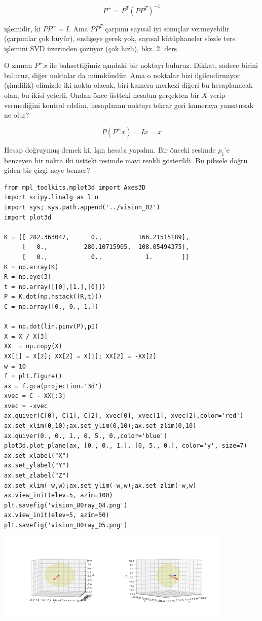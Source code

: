 \documentclass[12pt,fleqn]{article}\usepackage{../../common}
\begin{document}
$$ P^{+} = P^T(PP^T)^{-1}$$

işlemidir, ki $PP^{+} = I$. Ama $PP^T$ çarpımı sayısal iyi sonuçlar
vermeyebilir (çarpımlar çok büyür), endişeye gerek yok, sayısal
kütüphaneler sözde ters işlemini SVD üzerinden çözüyor (çok hızlı),
bkz. 2. ders.

O zaman $P^{+}x$ ile bahsettiğimiz ışındaki bir noktayı buluruz. Dikkat,
sadece birini buluruz, diğer noktalar da mümkündür. Ama o noktalar bizi
ilgilendirmiyor (şimdilik) elimizde iki nokta olacak, biri kamera merkezi
diğeri bu hesaplanacak olan, bu ikisi yeterli. Ondan önce üstteki hesabın
gerçekten bir $X$ verip vermediğini kontrol edelim, hesaplanan noktayı
tekrar geri kameraya yansıtırsak ne olur?

$$ P (P^{+}x) = Ix = x$$

Hesap doğruymuş demek ki. Işın hesabı yapalım. Bir önceki resimde $p_1$'e
benzeyen bir nokta iki üstteki resimde mavi renkli gösterildi. Bu piksele
doğru giden bir çizgi neye benzer?

\begin{verbatim}
from mpl_toolkits.mplot3d import Axes3D
import scipy.linalg as lin
import sys; sys.path.append('../vision_02')
import plot3d

K = [[ 282.363047,      0.,          166.21515189],
     [   0.,          280.10715905,  108.05494375],
     [   0.,            0.,            1.        ]]
K = np.array(K)
R = np.eye(3)
t = np.array([[0],[1.],[0]])
P = K.dot(np.hstack((R,t)))
C = np.array([0., 0., 1.])

X = np.dot(lin.pinv(P),p1)
X = X / X[3]
XX  = np.copy(X)
XX[1] = X[2]; XX[2] = X[1]; XX[2] = -XX[2]
w = 10
f = plt.figure()
ax = f.gca(projection='3d')
xvec = C - XX[:3] 
xvec = -xvec
ax.quiver(C[0], C[1], C[2], xvec[0], xvec[1], xvec[2],color='red')
ax.set_xlim(0,10);ax.set_ylim(0,10);ax.set_zlim(0,10)
ax.quiver(0., 0., 1., 0, 5., 0.,color='blue')
plot3d.plot_plane(ax, [0., 0., 1.], [0, 5., 0.], color='y', size=7)
ax.set_xlabel("X")
ax.set_ylabel("Y")
ax.set_zlabel("Z")
ax.set_xlim(-w,w);ax.set_ylim(-w,w);ax.set_zlim(-w,w)
ax.view_init(elev=5, azim=100)
plt.savefig('vision_80ray_04.png')
ax.view_init(elev=5, azim=50)
plt.savefig('vision_80ray_05.png')
\end{verbatim}

\includegraphics[width=15em]{vision_80ray_04.png}
\includegraphics[width=15em]{vision_80ray_05.png}
\end{document}
